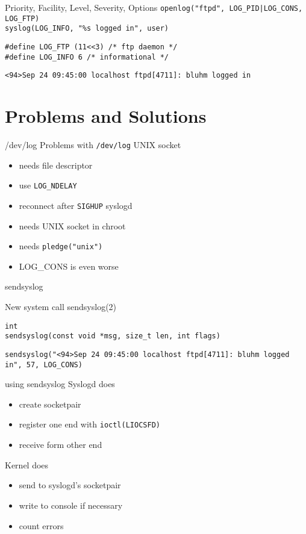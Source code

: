 \documentclass[14pt]{beamer}
\begin{document}
\begin{frame}{Priority, Facility, Level, Severity, Options}
    \texttt{openlog("ftpd", LOG\_PID|LOG\_CONS, LOG\_FTP)}\\
    \texttt{syslog(LOG\_INFO, "\%s logged in", user)}

    \vspace{.5cm}
    \texttt{\#define LOG\_FTP  (11<<3) /* ftp daemon */}\\
    \texttt{\#define LOG\_INFO 6       /* informational */ }

    \vspace{.5cm}
    \texttt{<94>Sep 24 09:45:00 localhost ftpd[4711]:\ bluhm logged in}
\end{frame}

\section{Problems and Solutions}

\begin{frame}{/dev/log}
Problems with \texttt{/dev/log} UNIX socket
\begin{itemize}
    \item needs file descriptor
    \item use \texttt{LOG\_NDELAY}
    \item reconnect after \texttt{SIGHUP} syslogd
    \item needs UNIX socket in chroot
    \item needs \texttt{pledge("unix")}
    \item LOG\_CONS is even worse
\end{itemize}
\end{frame}

\begin{frame}{sendsyslog}

New system call sendsyslog(2)

\vspace{.5cm}
\texttt{int \\
sendsyslog(const void *msg, size\_t len, int flags)}

\vspace{.5cm}
\texttt{sendsyslog("<94>Sep 24 09:45:00 localhost ftpd[4711]:\ bluhm logged in", 57, LOG\_CONS)}
\end{frame}

\begin{frame}{using sendsyslog}
Syslogd does
\begin{itemize}
    \item create socketpair
    \item register one end with \texttt{ioctl(LIOCSFD)}
    \item receive form other end
\end{itemize}
\vspace{.5cm}
Kernel does
\begin{itemize}
    \item send to syslogd's socketpair
    \item write to console if necessary
    \item count errors
\end{itemize}
\end{frame}
\end{document}
